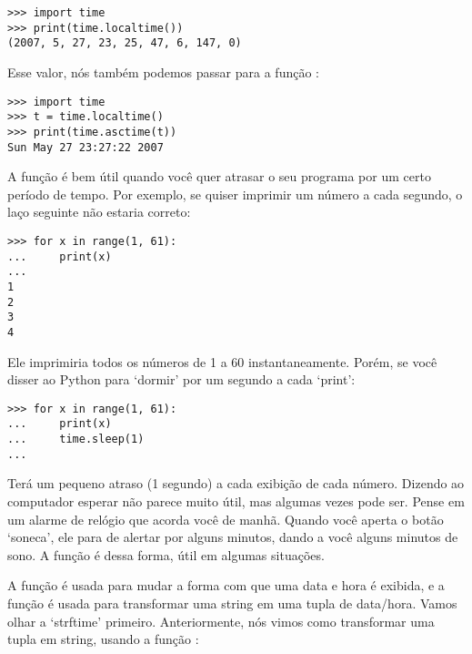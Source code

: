 \begin{listingignore}
\begin{verbatim}
>>> import time
>>> print(time.localtime())
(2007, 5, 27, 23, 25, 47, 6, 147, 0)
\end{verbatim}
\end{listingignore}

\noindent
Esse valor, nós também podemos passar para a função :

\begin{listingignore}
\begin{verbatim}
>>> import time
>>> t = time.localtime()
>>> print(time.asctime(t))
Sun May 27 23:27:22 2007
\end{verbatim}
\end{listingignore}

\noindent
A função  é bem útil quando você quer atrasar o seu programa por um certo período de tempo. Por exemplo, se quiser imprimir um número a cada segundo, o laço seguinte não estaria correto:

\begin{listing}
\begin{verbatim}
>>> for x in range(1, 61):
...     print(x)
...
1
2
3
4
\end{verbatim}
\end{listing}

Ele imprimiria todos os números de 1 a 60 instantaneamente. Porém, se você disser ao Python para `dormir' por um segundo a cada `print':

\begin{listing}
\begin{verbatim}
>>> for x in range(1, 61):
...     print(x)
...     time.sleep(1)
...
\end{verbatim}
\end{listing}

\noindent
Terá um pequeno atraso (1 segundo) a cada exibição de cada número. Dizendo ao computador esperar não parece muito útil, mas algumas vezes pode ser. Pense em um alarme de relógio que acorda você de manhã. Quando você aperta o botão `soneca', ele para de alertar por alguns minutos, dando a você alguns minutos de sono. A função  é dessa forma, útil em algumas situações.

A função  é usada para mudar a forma com que uma data e hora é exibida, e a função  é usada para transformar uma string em uma tupla de data/hora. Vamos olhar a `strftime' primeiro. Anteriormente, nós vimos como transformar uma tupla em string, usando a função :

